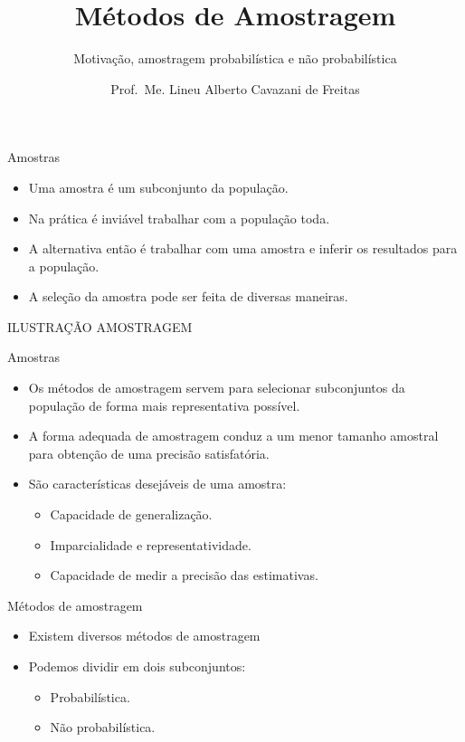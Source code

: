 \documentclass[
  ignorenonframetext,
  serif,
  professionalfont,
  usenames,
  dvipsnames,
  aspectratio = 169]{beamer}
\title{\textbf{Métodos de Amostragem}}
\subtitle{Motivação, amostragem probabilística e não probabilística}
\author{Prof.~Me. Lineu Alberto Cavazani de Freitas}
\date{}
\institute{\textbf{CE003 – Estatística II}\\
\strut \\
Departamento de Estatística\\
Laboratório de Estatística e Geoinformação}
\providecommand{\tightlist}{%
  \setlength{\itemsep}{0pt}\setlength{\parskip}{0pt}}
\renewcommand{\tightlist}{%
  \setlength{\itemsep}{0\baselineskip}
  \setlength{\parskip}{0.25\baselineskip}
}
\begin{document}
\frame{\titlepage}

\begin{frame}{Amostras}
\protect\hypertarget{amostras}{}
\begin{itemize}
\item
  Uma amostra é um subconjunto da população.
\item
  Na prática é inviável trabalhar com a população toda.
\item
  A alternativa então é trabalhar com uma amostra e inferir os
  resultados para a população.
\item
  A seleção da amostra pode ser feita de diversas maneiras.
\end{itemize}

ILUSTRAÇÃO AMOSTRAGEM
\end{frame}

\begin{frame}{Amostras}
\protect\hypertarget{amostras-1}{}
\begin{itemize}
\item
  Os métodos de amostragem servem para selecionar subconjuntos da
  população de forma mais representativa possível.
\item
  A forma adequada de amostragem conduz a um menor tamanho amostral para
  obtenção de uma precisão satisfatória.
\item
  São características desejáveis de uma amostra:

  \begin{itemize}
  \tightlist
  \item
    Capacidade de generalização.
  \item
    Imparcialidade e representatividade.
  \item
    Capacidade de medir a precisão das estimativas.
  \end{itemize}
\end{itemize}
\end{frame}

\begin{frame}{Métodos de amostragem}
\protect\hypertarget{muxe9todos-de-amostragem}{}
\begin{itemize}
\item
  Existem diversos métodos de amostragem
\item
  Podemos dividir em dois subconjuntos:

  \begin{itemize}
  \tightlist
  \item
    Probabilística.
  \item
    Não probabilística.
  \end{itemize}
\end{itemize}
\end{frame}
\end{document}
